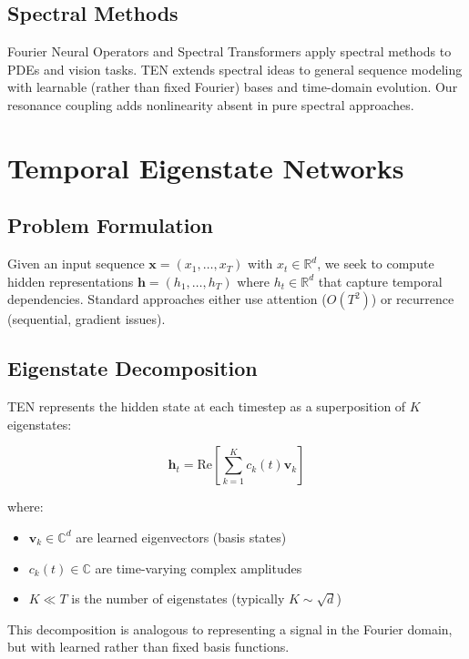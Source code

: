\documentclass[11pt,letterpaper]{article}
\newcommand{\R}{\mathbb{R}}
\newcommand{\C}{\mathbb{C}}
\begin{document}
\subsection{Spectral Methods}

Fourier Neural Operators \cite{li2020fourier} and Spectral Transformers \cite{gupta2022spectral} apply spectral methods to PDEs and vision tasks. TEN extends spectral ideas to general sequence modeling with learnable (rather than fixed Fourier) bases and time-domain evolution. Our resonance coupling adds nonlinearity absent in pure spectral approaches.

\section{Temporal Eigenstate Networks}
\label{sec:method}

\subsection{Problem Formulation}

Given an input sequence $\mathbf{x} = (x_1, \ldots, x_T)$ with $x_t \in \R^d$, we seek to compute hidden representations $\mathbf{h} = (h_1, \ldots, h_T)$ where $h_t \in \R^d$ that capture temporal dependencies. Standard approaches either use attention ($O(T^2)$) or recurrence (sequential, gradient issues).

\subsection{Eigenstate Decomposition}

TEN represents the hidden state at each timestep as a superposition of $K$ eigenstates:

\begin{equation}
    \mathbf{h}_t = \text{Re}\left[\sum_{k=1}^{K} c_k(t) \mathbf{v}_k\right]
\end{equation}

where:
\begin{itemize}
    \item $\mathbf{v}_k \in \C^d$ are learned eigenvectors (basis states)
    \item $c_k(t) \in \C$ are time-varying complex amplitudes
    \item $K \ll T$ is the number of eigenstates (typically $K \sim \sqrt{d}$)
\end{itemize}

This decomposition is analogous to representing a signal in the Fourier domain, but with learned rather than fixed basis functions.
\end{document}
